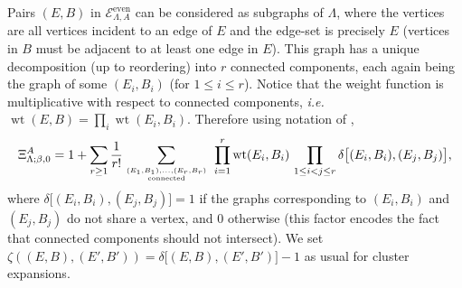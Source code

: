 \documentclass{amsart}
\DeclareMathOperator\wt{wt}
\numberwithin{equation}{section}
\theoremstyle{remark}
\begin{document}
Pairs $(E,B)$ in  $\mathcal{E}^{\text{even}}_{\Lambda,A}$ can be considered as subgraphs of $\Lambda$,
where the vertices are all vertices incident to an edge of $E$
and the edge-set is precisely $E$ (vertices in $B$ must be adjacent to at least one edge in $E$).
This graph has a unique decomposition (up to reordering) into $r$ connected components,
each again being the graph of some $(E_i,B_i)$ (for $1 \le i \le r$).
Notice that the weight function is multiplicative with respect to connected components,
{\em i.e.} $\wt(E,B)=\prod_i \wt(E_i,B_i)$.
Therefore using notation of \cite{Velenik},
\[ \Xi^A_{\Lambda;\beta,0} = 1 + \sum_{r \ge 1} \frac{1}{r!} \sum_{(E_1,B_1), \dots, (E_r,B_r) \atop \text{connected}}
\ \prod_{i=1}^r \wt(E_i,B_i) \, \prod_{1 \le i<j \le r} \delta\big[(E_i,B_i),(E_j,B_j) \big], \]
where 
$\delta\big[(E_i,B_i),(E_j,B_j) \big]=1$ if the graphs corresponding to $(E_i,B_i)$
and $(E_j,B_j)$ do not share a vertex, and $0$ otherwise
(this factor encodes the fact that connected components should not intersect).
We set $\zeta((E,B),(E',B'))=\delta\big[(E,B),(E',B')\big]-1$
as usual for cluster expansions.
\end{document}
